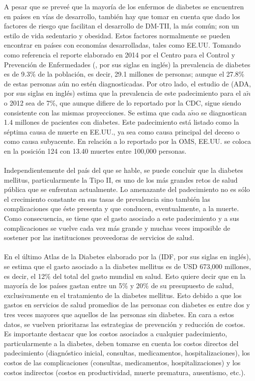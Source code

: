A pesar que se preve\'e que la mayor\'ia de los enfermos de diabetes se encuentren en pa\'ises en v\'ias de desarrollo, tambi\'en hay que tomar en cuenta que dado los factores de riesgo que facilitan el desarrollo de DM-TII, la m\'as com\'un; son un estilo de vida sedentario y obesidad. Estos factores normalmente se pueden encontrar en pa\'ises con econom\'ias desarrolladas, tales como EE.UU. Tomando como referencia el reporte elaborado en 2014 por el Centro para el Control y Prevenci\'on de Enfermedades (\cite{CDCStatistics}, por sus siglas en ingl\'es) la prevalencia de diabetes es de 9.3\% de la poblaci\'on, es decir, 29.1 millones de personas; aunque el 27.8\% de estas personas a\'un no est\'en diagnosticadas. Por otro lado, el estudio de \cite{american2013economic} (ADA, por sus siglas en ingl\'es) estima que la prevalencia de este padecimiento para el a$\tilde{n}$o 2012 sea de 7\%, que aunque difiere de lo reportado por la CDC, sigue siendo consistente con las mismas proyecciones. Se estima que cada a$\tilde{n}$o se diagnostican 1.4 millones de pacientes con diabetes. Este padecimiento est\'a listado como la s\'eptima causa de muerte en EE.UU., ya sea como causa principal del deceso o como causa subyacente. En relaci\'on a lo reportado por la OMS, EE.UU. se coloca en la posici\'on 124 con 13.40 muertes entre 100,000 personas. \\
\\
Independientemente del pa\'is del que se hable, se puede concluir que la diabetes mellitus, particularmente la Tipo II, es uno de los m\'as grandes retos de salud p\'ublica que se enfrentan actualmente. Lo amenazante del padecimiento no es s\'olo el crecimiento constante en sus tasas de prevalencia sino tambi\'en las complicaciones que \'este presenta y que conducen, eventualmente, a la muerte. Como consecuencia, se tiene que el gasto asociado a este padecimiento y a sus complicaciones se vuelve cada vez m\'as grande y muchas veces imposible de sostener por las instituciones proveedoras de servicios de salud.\\
\\
En el \'ultimo Atlas de la Diabetes elaborado por la \cite{atlas2015international} (IDF, por sus siglas en ingl\'es), se estima que el gasto asociado a la diabetes mellitus es de USD 673,000 millones, es decir, el 12\% del total del gasto mundial en salud. Esto quiere decir que en la mayor\'ia de los pa\'ises gastan entre un 5\% y 20\% de su presupuesto de salud, exclusivamente en el tratamiento de la diabetes mellitus. Esto debido a que los gastos en servicios de salud promedios de las personas con diabetes es entre dos y tres veces mayores que aquellos de las personas sin diabetes. En cara a estos datos, se vuelven prioritaras las estrategias de prevenci\'on y reducci\'on de costos. Es importante destacar que los costos asociados a cualquier padecimiento, particularmente a la diabetes, deben tomarse en cuenta los costos directos del padecimiento (diagn\'ostico inicial, consultas, medicamentos, hospitalizaciones), los costos de las complicaciones (consultas, medicamentos, hospitalizaciones) y los costos indirectos (costos en productividad, muerte prematura, ausentismo, etc.).\\
